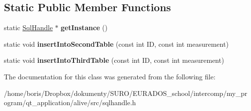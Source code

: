 \subsection*{Static Public Member Functions}
\begin{DoxyCompactItemize}
\item 
\hypertarget{classSqlHandle_a508226e88c14ca5d276cc767f6572b71}{static \hyperlink{classSqlHandle}{Sql\-Handle} $\ast$ {\bfseries get\-Instance} ()}\label{classSqlHandle_a508226e88c14ca5d276cc767f6572b71}

\item 
\hypertarget{classSqlHandle_a15e01a13e792ddd03ecfe81f0b19b002}{static void {\bfseries insert\-Into\-Second\-Table} (const int I\-D, const int measurement)}\label{classSqlHandle_a15e01a13e792ddd03ecfe81f0b19b002}

\item 
\hypertarget{classSqlHandle_ada1895a0832932054445a2548a44b5f8}{static void {\bfseries insert\-Into\-Third\-Table} (const int I\-D, const int measurement)}\label{classSqlHandle_ada1895a0832932054445a2548a44b5f8}

\end{DoxyCompactItemize}


The documentation for this class was generated from the following file\-:\begin{DoxyCompactItemize}
\item 
/home/boris/\-Dropbox/dokumenty/\-S\-U\-R\-O/\-E\-U\-R\-A\-D\-O\-S\-\_\-school/intercomp/my\-\_\-program/qt\-\_\-application/alive/src/sqlhandle.\-h\end{DoxyCompactItemize}
